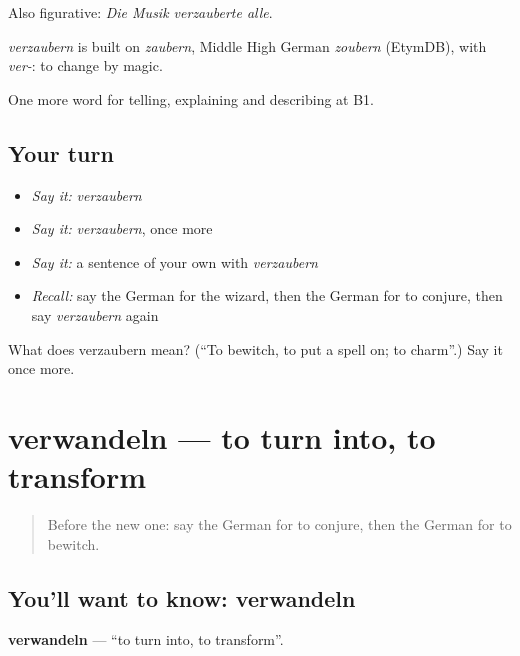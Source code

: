 Also figurative: \emph{Die Musik verzauberte alle}.

\begin{cousinweb}
\emph{verzaubern} is built on \emph{zaubern}, Middle High German \emph{zoubern} (EtymDB), with \emph{ver-}: to change by magic.
\end{cousinweb}

\begin{grammarlens}[title={What you've built}]
One more word for telling, explaining and describing at B1.
\end{grammarlens}

\subsection*{Your turn}
\begin{itemize}
\raggedright
  \item \emph{Say it:} \emph{verzaubern}
  \item \emph{Say it:} \emph{verzaubern}, once more
  \item \emph{Say it:} a sentence of your own with \emph{verzaubern}
  \item \emph{Recall:} say the German for the wizard, then the German for to conjure, then say \emph{verzaubern} again
\end{itemize}

\begin{tcolorbox}[breakable,colback=teal!4,colframe=teal!35!black,title={Before you move on}]
What does verzaubern mean? (\textquotedblleft{}To bewitch, to put a spell on; to charm\textquotedblright{}.) Say it once more.
\end{tcolorbox}
\section[verwandeln]{verwandeln — to turn into, to transform}

\label{lesson:GE-C314-verwandeln}



\begin{quote}
Before the new one: say the German for to conjure, then the German for to bewitch.
\end{quote}

\subsection*{You'll want to know: verwandeln}
\textbf{verwandeln} — \textquotedblleft{}to turn into, to transform\textquotedblright{}.

